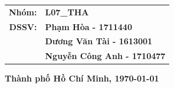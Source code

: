 \begin{titlepage}
\begin{center}
\begin{tabular}{ll}
		\multicolumn{1}{r}{\textbf{Nhóm:}} 
		& \textbf{L07_THA}\\		
		
		\multicolumn{1}{r}{\textbf{DSSV:}}
		& \textbf{Phạm Hòa - 1711440}\\
		& \textbf{Dương Văn Tài - 1613001}\\
		& \textbf{Nguyễn Công Anh - 1710477}\\
		
\end{tabular}

\vspace{4.0cm}  

{\normalsize \textbf{Thành phố Hồ Chí Minh, \today}}

\end{center}

\end{titlepage}

